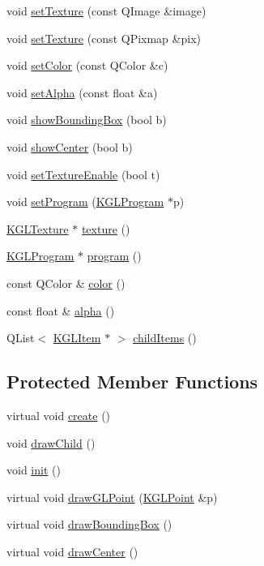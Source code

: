 \begin{CompactItemize}
void \hyperlink{class_k_g_l_item_c68ff3db4cf505a10c1f95dbb24b3d8e}{setTexture} (const QImage \&image)
\item 
void \hyperlink{class_k_g_l_item_3cf5a12787e3a1be3695a4a2460b9f0d}{setTexture} (const QPixmap \&pix)
\item 
void \hyperlink{class_k_g_l_item_ccd2a4bf039b7274a0df572bd341d2d9}{setColor} (const QColor \&c)
\item 
void \hyperlink{class_k_g_l_item_0e29a2ca6924be0e2c950fd5c764fdab}{setAlpha} (const float \&a)
\item 
void \hyperlink{class_k_g_l_item_f1bec83ac3d7ad0a43cee9253d482343}{showBoundingBox} (bool b)
\item 
void \hyperlink{class_k_g_l_item_defcc7f3930968a04620e378fa7ba2b6}{showCenter} (bool b)
\item 
void \hyperlink{class_k_g_l_item_e3f2d07953ada32dafa43b48a3062677}{setTextureEnable} (bool t)
\item 
void \hyperlink{class_k_g_l_item_d615added4952e9d4e386ab8606872d6}{setProgram} (\hyperlink{class_k_g_l_program}{KGLProgram} $\ast$p)
\item 
\hyperlink{class_k_g_l_texture}{KGLTexture} $\ast$ \hyperlink{class_k_g_l_item_d5e6b6171894e455e36994b76ccb7f97}{texture} ()
\item 
\hyperlink{class_k_g_l_program}{KGLProgram} $\ast$ \hyperlink{class_k_g_l_item_3d4fca70cb1b6c9fab99b02696c50ca0}{program} ()
\item 
const QColor \& \hyperlink{class_k_g_l_item_cc12f268b3573be5aa6cb9aeb64723aa}{color} ()
\item 
const float \& \hyperlink{class_k_g_l_item_b9e32117300fa687fa861903af862731}{alpha} ()
\item 
QList$<$ \hyperlink{class_k_g_l_item}{KGLItem} $\ast$ $>$ \hyperlink{class_k_g_l_item_1dcc73984997f926f8188663f2e98443}{childItems} ()
\end{CompactItemize}
\subsection*{Protected Member Functions}
\begin{CompactItemize}
\item 
virtual void \hyperlink{class_k_g_l_item_bf80656de9729f6e5c0519ecb1a2301b}{create} ()
\item 
void \hyperlink{class_k_g_l_item_492b385411549f646d1278db59706779}{drawChild} ()
\item 
void \hyperlink{class_k_g_l_item_2227b986b72366e149815a5fa5838d52}{init} ()
\item 
virtual void \hyperlink{class_k_g_l_item_1d33b3aacc34428bc199771a90b00bc0}{drawGLPoint} (\hyperlink{class_k_g_l_point}{KGLPoint} \&p)
\item 
virtual void \hyperlink{class_k_g_l_item_6b5f40aeec53896189e8dd4f8fefb76b}{drawBoundingBox} ()
\item 
virtual void \hyperlink{class_k_g_l_item_ff61febb3b171446aacf3c6c947fa475}{drawCenter} ()
\end{CompactItemize}


